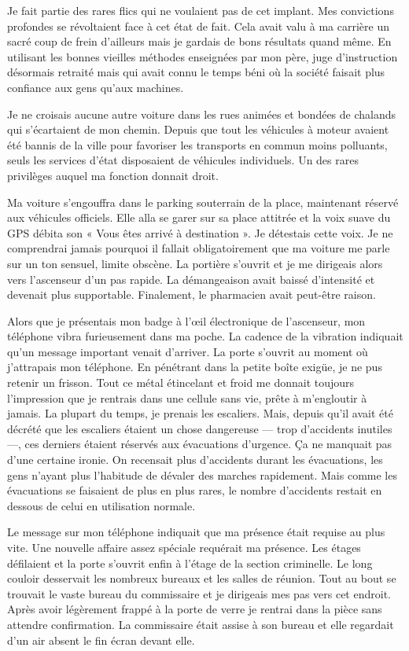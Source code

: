 Je fait partie des rares flics qui ne voulaient pas de cet implant. Mes
convictions profondes se révoltaient face à cet état de fait. Cela avait valu à
ma carrière un sacré coup de frein d'ailleurs mais je gardais de bons résultats
quand même. En utilisant les bonnes vieilles méthodes enseignées par mon père,
juge d'instruction désormais retraité mais qui avait connu le temps béni où la
société faisait plus confiance aux gens qu'aux machines.

Je ne croisais aucune autre voiture dans les rues animées et bondées de
chalands qui s'écartaient de mon chemin. Depuis que tout les véhicules à moteur
avaient été bannis de la ville pour favoriser les transports en commun moins
polluants, seuls les services d'état disposaient de véhicules individuels. Un
des rares privilèges auquel ma fonction donnait droit.

Ma voiture s'engouffra dans le parking souterrain de la place, maintenant
réservé aux véhicules officiels. Elle alla se garer sur sa place attitrée et la
voix suave du GPS débita son « Vous êtes arrivé à destination ». Je détestais
cette voix. Je ne comprendrai jamais pourquoi il fallait obligatoirement que ma
voiture me parle sur un ton sensuel, limite obscène. La portière s'ouvrit et je
me dirigeais alors vers l'ascenseur d'un pas rapide. La démangeaison avait
baissé d'intensité et devenait plus supportable. Finalement, le pharmacien
avait peut-être raison.

Alors que je présentais mon badge à l'œil électronique de l'ascenseur, mon
téléphone vibra furieusement dans ma poche. La cadence de la vibration
indiquait qu'un message important venait d'arriver. La porte s'ouvrit au moment
où j'attrapais mon téléphone. En pénétrant dans la petite boîte exigüe, je ne
pus retenir un frisson. Tout ce métal étincelant et froid me donnait toujours
l'impression que je rentrais dans une cellule sans vie, prête à m'engloutir à
jamais. La plupart du temps, je prenais les escaliers. Mais, depuis qu'il avait
été décrété que les escaliers étaient un chose dangereuse — trop d'accidents
inutiles —, ces derniers étaient réservés aux évacuations d'urgence. Ça ne
manquait pas d'une certaine ironie. On recensait plus d'accidents durant les
évacuations, les gens n'ayant plus l'habitude de dévaler des marches
rapidement. Mais comme les évacuations se faisaient de plus en plus rares, le
nombre d'accidents restait en dessous de celui en utilisation normale.

Le message sur mon téléphone indiquait que ma présence était requise au plus
vite. Une nouvelle affaire assez spéciale requérait ma présence. Les étages
défilaient et la porte s'ouvrit enfin à l'étage de la section criminelle. Le
long couloir desservait les nombreux bureaux et les salles de réunion. Tout au
bout se trouvait le vaste bureau du commissaire et je dirigeais mes pas vers cet
endroit. Après avoir légèrement frappé à la porte de verre je rentrai dans la
pièce sans attendre confirmation. La commissaire était assise à son bureau et
elle regardait d'un air absent le fin écran devant elle.

